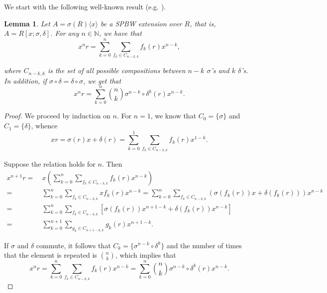 \documentclass{amsart}
\newtheorem{lemma}[theorem]{Lemma}
\theoremstyle{definition}
\theoremstyle{remark}
\numberwithin{equation}{section}
\begin{document}
We start with the following well-known result (e.g. \cite[Section 2]{LamLeroyMatczuk1997}).

\begin{lemma}\label{commrule1}
Let $A = \sigma(R) \langle x \rangle$ be a SPBW extension over $R$, that is, $A = R[x; \sigma, \delta]$. For any $n \in \mathbb{N}$, we have that
\begin{equation*}
    x^nr = \sum_{k=0}^{n}\sum_{f_k\in C_{n-k,k}}f_k(r) x^{n-k},
\end{equation*}

where $C_{n-k,k}$ is the set of all possible compositions between $n-k$ $\sigma$'s and $k$ $\delta$'s. In addition, if $\sigma \circ \delta = \delta \circ \sigma$, we get that
\begin{equation*}
x^n r = \sum_{k=0}^{n}\binom{n}{k}\sigma^{n-k}\circ\delta^{k}(r) x^{n-k}.
\end{equation*}
\end{lemma}
\begin{proof}
We proceed by induction on $n$. For $n=1$, we know that $C_0=\{\sigma\}$ and $C_1=\{\delta\}$, whence
\begin{equation*}
    xr = \sigma(r)x + \delta(r) = \sum_{k=0}^{1}\sum_{f_k\in C_{n-k,k}}f_k(r) x^{1-k}.
\end{equation*}

Suppose the relation holds for $n$. Then
\begin{align*}
    x^{n+1} r = &\ x \left(\sum_{k=0}^{n}\sum_{f_k\in C_{n-k,k}}f_k(r) x^{n-k}\right) \\
    = &\ \sum_{k=0}^{n}\sum_{f_k\in C_{n-k,k}} x f_k(r) x^{n-k} = \sum_{k=0}^{n}\sum_{f_k\in C_{n-k,k}}(\sigma(f_k(r)) x + \delta(f_k(r))) x^{n-k} \\
    = &\ \sum_{k=0}^{n}\sum_{f_k\in C_{n-k,k}}\left[\sigma(f_k(r)) x^{n+1-k}+\delta(f_k(r)) x^{n-k}\right] \\
    = &\ \sum_{k=0}^{n+1}\sum_{g_k\in C_{n+1-k,k}}g_k(r) x^{n+1-k}.
\end{align*}

If $\sigma$ and $\delta$ commute, it follows that $C_k=\{\sigma^{n-k}\circ\delta^k\}$ and the number of times that the element is repeated is $\binom{n}{k}$, which implies that 
\begin{equation*}
    x^n r = \sum_{k=0}^{n}\sum_{f_k\in C_{n-k,k}}f_k(r) x^{n-k}=\sum_{k=0}^{n}\binom{n}{k}\sigma^{n-k}\circ\delta^{k}(r) x^{n-k}.
\end{equation*}
\end{proof}
\end{document}
